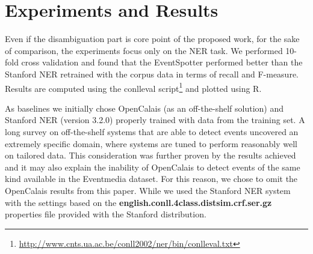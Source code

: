 \documentclass[10pt,a4paper]{article}
\begin{document}
\section{Experiments and Results}
Even if the disambiguation part is core point of the proposed work, for the sake of comparison, the experiments focus only on the NER task. We performed 10-fold cross validation and found that the EventSpotter performed better than the Stanford NER retrained with the corpus data in terms of recall and F-measure. Results are computed using the conlleval script\footnote{\url{http://www.cnts.ua.ac.be/conll2002/ner/bin/conlleval.txt}} and plotted using R.

As baselines we initially chose OpenCalais (as an off-the-shelf solution) and Stanford NER (version 3.2.0) properly trained with data from the training set. 
A long survey on off-the-shelf systems that are able to detect events uncovered an extremely specific domain, where systems are tuned to perform reasonably well on tailored data. This consideration was further proven by the results achieved and it may also explain the inability of OpenCalais to detect events of the same kind available in the Eventmedia dataset. For this reason, we chose to omit the OpenCalais results from this paper.
While we used the Stanford NER system with the settings based on the \textbf{english.conll.4class.distsim.crf.ser.gz} properties file provided with the Stanford distribution.
\end{document}
